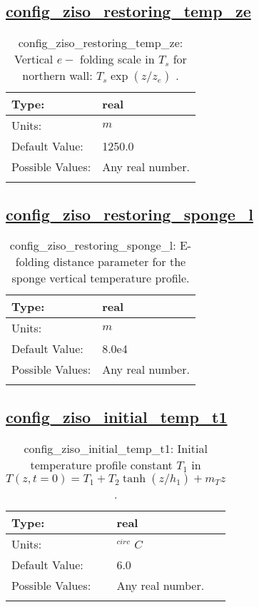 \subsection[config\_ziso\_restoring\_temp\_ze]{\hyperref[sec:nm_tab_ziso]{config\_ziso\_restoring\_temp\_ze}}
\label{subsec:nm_sec_config_ziso_restoring_temp_ze}
\begin{center}
\begin{longtable}{| p{2.0in} || p{4.0in} |}
    \hline
    Type: & real \\
    \hline
    Units: & $m$ \\
    \hline
    Default Value: & 1250.0 \\
    \hline
    Possible Values: & Any real number. \\
    \hline
    \caption{config\_ziso\_restoring\_temp\_ze:  Vertical  $e-$ folding scale in  $T_s$  for northern wall:  $T_s \exp(z/z_e)$ .}
\end{longtable}
\end{center}
\subsection[config\_ziso\_restoring\_sponge\_l]{\hyperref[sec:nm_tab_ziso]{config\_ziso\_restoring\_sponge\_l}}
\label{subsec:nm_sec_config_ziso_restoring_sponge_l}
\begin{center}
\begin{longtable}{| p{2.0in} || p{4.0in} |}
    \hline
    Type: & real \\
    \hline
    Units: & $m$ \\
    \hline
    Default Value: & 8.0e4 \\
    \hline
    Possible Values: & Any real number. \\
    \hline
    \caption{config\_ziso\_restoring\_sponge\_l: E-folding distance parameter for the sponge vertical temperature profile.}
\end{longtable}
\end{center}
\subsection[config\_ziso\_initial\_temp\_t1]{\hyperref[sec:nm_tab_ziso]{config\_ziso\_initial\_temp\_t1}}
\label{subsec:nm_sec_config_ziso_initial_temp_t1}
\begin{center}
\begin{longtable}{| p{2.0in} || p{4.0in} |}
    \hline
    Type: & real \\
    \hline
    Units: & $^{circ}$ $C$ \\
    \hline
    Default Value: & 6.0 \\
    \hline
    Possible Values: & Any real number. \\
    \hline
    \caption{config\_ziso\_initial\_temp\_t1:  Initial temperature profile constant  $T_1$  in  $T(z,t=0) = T_1 + T_2 \tanh(z/h_1) + m_T z$ .}
\end{longtable}
\end{center}
